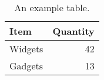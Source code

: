 \documentclass[10pt, a4paper]{article}
\begin{document}
\begin{table}
    \centering
    \caption{\label{tab:widgets}An example table.}
    \begin{tabular}{l|r} \hline
    Item & Quantity \\\hline
    Widgets & 42 \\
    Gadgets & 13 \\\hline
    \end{tabular}
\end{table}
\end{document}
